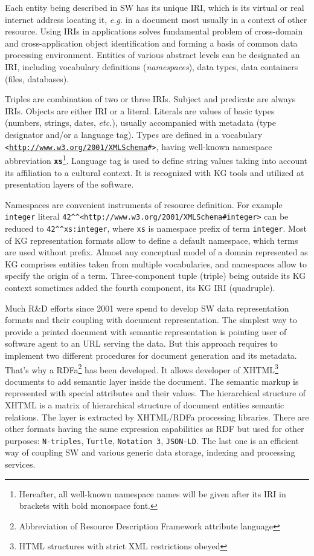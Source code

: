 \documentclass[
]{ceurart}
\newcommand{\ns}[1]{\textbf{\texttt{#1}}}
\begin{document}
Each entity being described in SW has its unique IRI, which is its virtual or real internet address locating it, \emph{e.g.} in a document most usually in a context of other resource.  Using IRIs in applications solves fundamental problem of cross-domain and cross-application object identification and forming a basis of common data processing environment.  Entities of various abstract levels can be designated an IRI, including vocabulary definitions (\emph{namespaces}), data types, data containers (files, databases).

Triples are combination of two or three IRIs.  Subject and predicate are always IRIs.  Objects are either IRI or a literal.  Literals are values of basic types (numbers, strings, dates, \emph{etc.}), usually accompanied with metadata (type designator and/or a language tag).  Types are defined in a vocabulary \texttt{<\url{http://www.w3.org/2001/XMLSchema}\#>}, having well-known namespace abbreviation \ns{xs}\footnote{Hereafter, all well-known namespace names will be given after its IRI in brackets with bold monospace font.}.  Language tag is used to define string values taking into account its affiliation to a cultural context.  It is recognized with KG tools and utilized at presentation layers of the software.

Namespaces are convenient instruments of resource definition.  For example \verb|integer| literal \verb|42^^<http://www.w3.org/2001/XMLSchema#integer>| can be reduced to \verb|42^^xs:integer|, where \verb|xs| is namespace prefix of term \verb|integer|.  Most of KG representation formats allow to define a default namespace, which terms are used without prefix.   Almost any conceptual model of a domain represented as KG comprises entities taken from multiple vocabularies, and namespaces allow to specify the origin of a term.  Three-component tuple (triple) being outside its KG context sometimes added the fourth component, its KG IRI (quadruple).

Much R\&D efforts since 2001 \cite{tbl} were spend to develop SW data representation formats and their coupling with document representation. The simplest way to provide a printed document with semantic representation is pointing user of software agent to an URL serving the data.  But this approach requires to implement two different procedures for document generation and its metadata.  That's why a RDFa\footnote{Abbreviation of Resource Description Framework attribute language} has been developed.  It allows developer of XHTML\footnote{HTML structures with strict XML restrictions obeyed} documents to add semantic layer inside the document.  The semantic markup is represented with special attributes and their values.  The hierarchical structure of XHTML is a matrix of hierarchical structure of document entities semantic relations.  The layer is extracted by XHTML/RDFa processing libraries.  There are other formats having the same expression capabilities as RDF but used for other purposes: \texttt{N-triples}, \texttt{Turtle}, \texttt{Notation~3}, \texttt{JSON-LD}.  The last one is an efficient way of coupling SW and various generic data storage, indexing and processing services.
\end{document}
